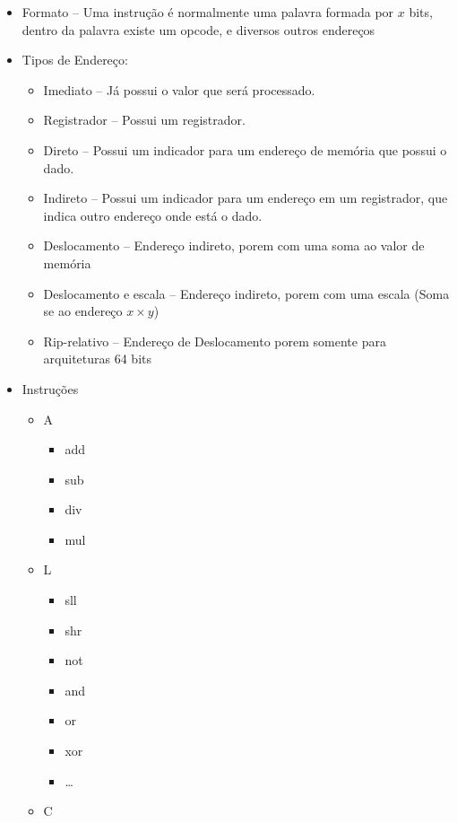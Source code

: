 \documentclass[12pt]{article}
\begin{document}
\begin{itemize}
\begin{itemize}
    \end{itemize}
    \item Formato -- Uma instrução é normalmente uma palavra formada por $x$ 
    bits, dentro da palavra existe um opcode, e diversos outros endereços
    \item Tipos de Endereço:
    \begin{itemize}
        \item Imediato -- Já possui o valor que será processado.
        \item Registrador -- Possui um registrador.
        \item Direto -- Possui um indicador para um endereço de memória que 
        possui o dado.
        \item Indireto -- Possui um indicador para um endereço em um registrador, 
        que indica outro endereço onde está o dado.
        \item Deslocamento -- Endereço indireto, porem com uma soma ao valor de 
        memória
        \item Deslocamento e escala -- Endereço indireto, porem com uma escala 
        (Soma se ao endereço $x \times y$)
        \item Rip-relativo -- Endereço de Deslocamento porem somente para 
        arquiteturas 64 bits
    \end{itemize}
    \item Instruções
    \begin{itemize}
        \item A 
        \begin{itemize}
            \item add
            \item sub
            \item div
            \item mul
        \end{itemize}
        \item L
        \begin{itemize}
            \item sll
            \item shr
            \item not
            \item and
            \item or
            \item xor
            \item \ldots
        \end{itemize}
        \item C

\end{itemize}
\end{itemize}
\end{document}
